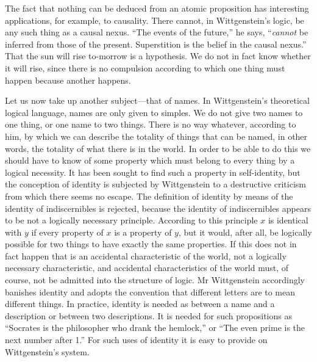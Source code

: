 The fact that nothing can be deduced from an atomic
proposition has interesting applications, for example, to
causality. There cannot, in Wittgenstein's logic, be any
such thing as a causal nexus. ``The events of the future,''
he says, ``\emph{cannot} be inferred from those of the present.
Superstition is the belief in the causal nexus.'' That the
sun will rise to-morrow is a hypothesis. We do not in
fact know whether it will rise, since there is no compulsion
according to which one thing must happen because another
happens.

Let us now take up another subject---that of names.
In Wittgenstein's theoretical logical language, names are
only given to simples. We do not give two names to
one thing, or one name to two things. There is no way
whatever, according to him, by which we can describe
the totality of things that can be named, in other words,
the totality of what there is in the world. In order to be
able to do this we should have to know of some property
which must belong to every thing by a logical necessity.
It has been sought to find such a property in self-identity,
but the conception of identity is subjected by Wittgenstein
to a destructive criticism from which there seems no escape.
The definition of identity by means of the identity of indiscernibles
is rejected, because the identity of indiscernibles
appears to be not a logically necessary principle. According
to this principle $x$ is identical with $y$ if every property
of $x$ is a property of $y$, but it would, after all, be logically
possible for two things to have exactly the same properties.
If this does not in fact happen that is an accidental
characteristic of the world, not a logically necessary
characteristic, and accidental characteristics of the world
must, of course, not be admitted into the structure of
logic. Mr Wittgenstein accordingly banishes identity
and adopts the convention that different letters are to
mean different things. In practice, identity is needed as
between a name and a description or between two descriptions.
It is needed for such propositions as ``Socrates
is the philosopher who drank the hemlock,'' or ``The
even prime is the next number after 1.'' For such uses
of identity it is easy to provide on Wittgenstein's system.

